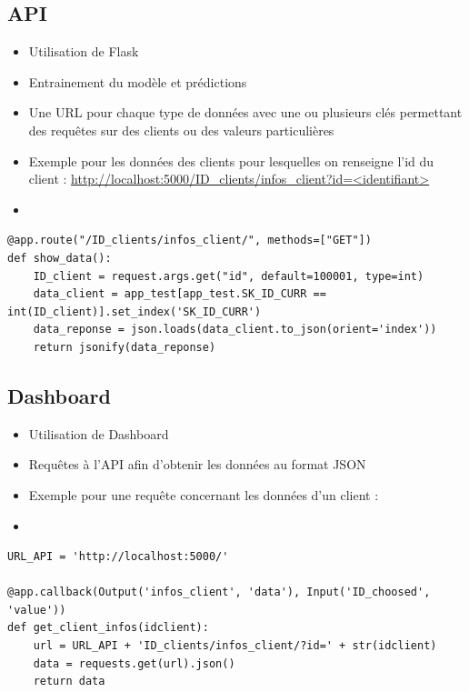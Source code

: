 \documentclass[8pt,aspectratio=169,hyperref={unicode=true}]{beamer}
\begin{document}
\subsection{API}
\begin{frame}[fragile]{\insertsection}{\insertsubsection}
    \begin{itemize}
        \item Utilisation de Flask
        \item Entrainement du modèle et prédictions
        \item Une URL pour chaque type de données avec une ou plusieurs clés permettant des requêtes sur des clients ou des valeurs particulières
        \item Exemple pour les données des clients pour lesquelles on renseigne l'id du client : \url{http://localhost:5000/ID_clients/infos_client?id=<identifiant>}
        \item[]
    \end{itemize}
    \begin{verbatim}
@app.route("/ID_clients/infos_client/", methods=["GET"])
def show_data():
    ID_client = request.args.get("id", default=100001, type=int)
    data_client = app_test[app_test.SK_ID_CURR == int(ID_client)].set_index('SK_ID_CURR')
    data_reponse = json.loads(data_client.to_json(orient='index'))
    return jsonify(data_reponse)    
    \end{verbatim}
\end{frame}

\subsection{Dashboard}
\begin{frame}[fragile]{\insertsection}{\insertsubsection}
    \begin{itemize}
        \item Utilisation de Dashboard
        \item Requêtes à l'API afin d'obtenir les données au format JSON
        \item Exemple pour une requête concernant les données d'un client :
        \item[]
    \end{itemize}
    \begin{verbatim}
URL_API = 'http://localhost:5000/'

@app.callback(Output('infos_client', 'data'), Input('ID_choosed', 'value'))
def get_client_infos(idclient):
    url = URL_API + 'ID_clients/infos_client/?id=' + str(idclient)
    data = requests.get(url).json()
    return data 
            \end{verbatim}
\end{frame}
\end{document}
